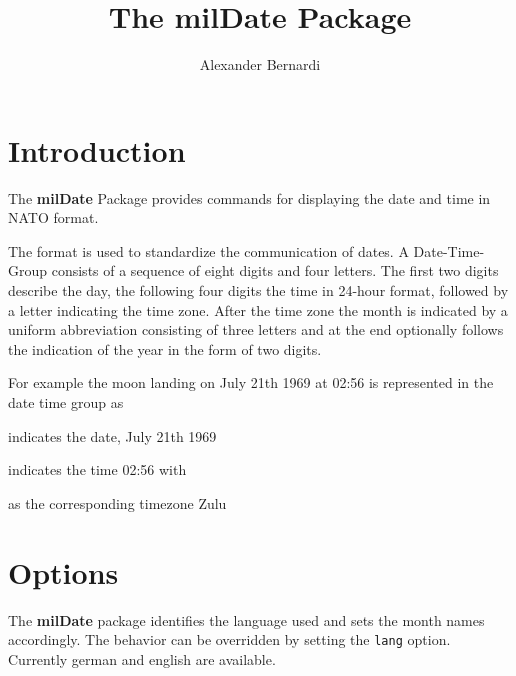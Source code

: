 \documentclass[a4paper,10pt]{scrarticle}
\title{\textnormal{The \textbf{milDate} Package}}
\author{Alexander Bernardi}
\begin{document}
\maketitle

\section{Introduction}

The \textbf{milDate} Package provides commands for displaying the date and time in NATO format.\par
The format is used to standardize the communication of dates.
A Date-Time-Group consists of a sequence of eight digits and four letters. The first two digits describe the day, the following four digits the time in 24-hour format, followed by a letter indicating the time zone. After the time zone the month is indicated by a uniform abbreviation consisting of three letters and at the end optionally follows the indication of the year in the form of two digits. \par
For example the moon landing on July 21th 1969 at 02:56 is represented in the date time group as
\par\begin{center}
\end{center}\par

 indicates the date, July 21th 1969\par\medskip

 indicates the time 02:56 with \par\medskip
{} as the corresponding timezone Zulu\par\medskip

\section{Options}

\noindent{} The \textbf{milDate} package identifies the language used and sets the month names accordingly. The behavior can be overridden by setting the \verb+lang+ option.
Currently german and english are available.
\end{document}
